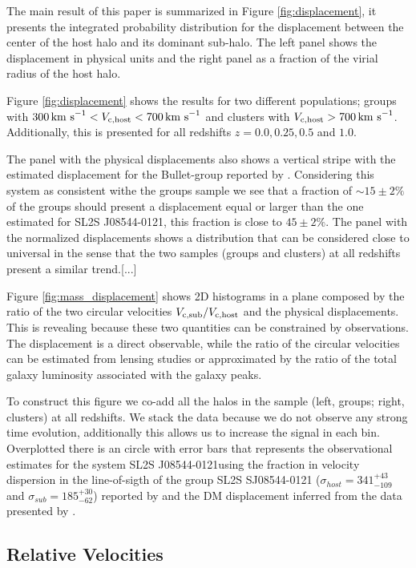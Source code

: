 \documentclass{emulateapj}
\newcommand{\kms}{{\ifmmode{{\mathrm{\,km\ s}^{-1}}}\else{\,km~s$^{-1}$}\fi}}
\newcommand{\bullg}{SL2S J08544-0121}
\begin{document}
The main result of this paper is summarized in Figure
\ref{fig:displacement}, it presents the integrated
probability distribution for the displacement between the center of
the host halo and its dominant sub-halo. The left panel shows
the displacement in physical units and the right panel as a fraction
of the virial radius of the host halo. 

Figure \ref{fig:displacement} shows the results for two different
populations; groups with $300\kms < V_{\rm c, host}<700\kms$ and
clusters with $V_{\rm c,host}>700\kms$. Additionally, this is
presented for all redshifts $z=0.0, 0.25, 0.5$ and $1.0$. 

The panel with the physical displacements also shows a vertical stripe
with the estimated displacement for the Bullet-group reported by
\cite{Gastaldello}. Considering this system as consistent withe the
groups sample we see that a fraction of $\sim 15\pm 2\%$ of the groups
should present a displacement equal or larger than the one estimated
for \bullg, this fraction is close to $45\pm2\% $. The panel with the
normalized displacements shows a  distribution that can be considered
close to universal in the sense that the two samples (groups and
clusters) at all redshifts present a similar trend.[...]

Figure \ref{fig:mass_displacement} shows 2D histograms in a plane
composed by the ratio of the two circular velocities $V_{\rm c,
  sub}/V_{\rm c, host}$ and the physical displacements. This is
revealing because these two quantities can be constrained by
observations. The displacement is a direct observable, while the ratio
of the circular velocities can be estimated from lensing studies or
approximated by the ratio of the total galaxy luminosity associated
with the galaxy peaks.

To construct this figure we co-add all the halos in the sample (left,
groups; right, clusters) at all redshifts. We stack the data because
we do not observe any strong time evolution, additionally this allows
us to increase the signal in each bin. Overplotted there is an circle
with error bars that represents the observational estimates for the
system \bullg using the fraction in velocity dispersion in
the line-of-sigth of the group SL2S SJ08544-0121
($\sigma_{host}=341^{+43}_{-109}$\kms and
$\sigma_{sub}=185^{+30}_{-62}$\kms) reported by
\citet{2013A&A...552A..80M} and the DM displacement inferred from the
data presented by \cite{Gastaldello}.


\subsection{Relative Velocities}
\label{sec:velocities}
\end{document}
